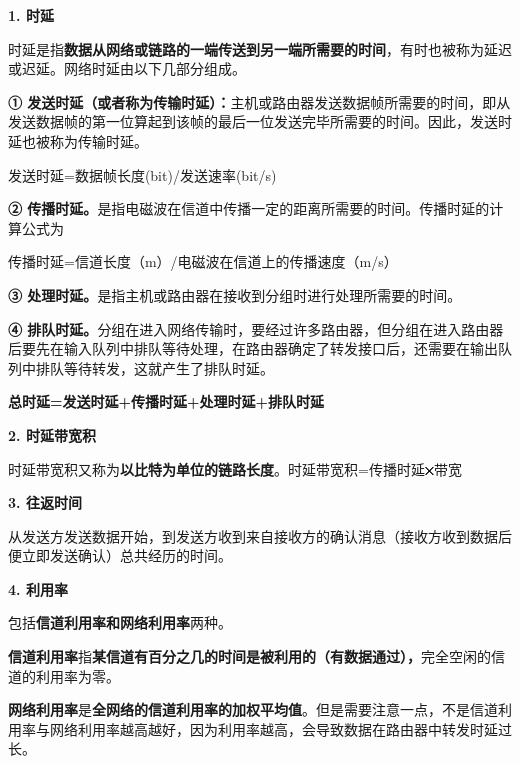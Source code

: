 \textbf{{1. 时延}}

时延是指\textbf{数据从网络或链路的一端传送到另一端所需要的时间}，有时也被称为延迟或迟延。网络时延由以下几部分组成。

\textbf{①
发送时延（或者称为传输时延）：}主机或路由器发送数据帧所需要的时间，即从发送数据帧的第一位算起到该帧的最后一位发送完毕所需要的时间。因此，发送时延也被称为传输时延。

{发送时延=数据帧长度(bit)/发送速率(bit/s)}

\textbf{②
传播时延。}是指电磁波在信道中传播一定的距离所需要的时间。传播时延的计算公式为

{传播时延=信道长度（m）/电磁波在信道上的传播速度（m/s）}

\textbf{③
处理时延。}是指主机或路由器在接收到分组时进行处理所需要的时间。

\textbf{④
排队时延。}分组在进入网络传输时，要经过许多路由器，但分组在进入路由器后要先在输入队列中排队等待处理，在路由器确定了转发接口后，还需要在输出队列中排队等待转发，这就产生了排队时延。

\textbf{总时延=发送时延+传播时延+处理时延+排队时延}

\textbf{{2. 时延带宽积}}

时延带宽积又称为\textbf{以比特为单位的链路长度}。时延带宽积=传播时延\includegraphics[width=0.09375in,height=0.08333in]{texmath/ff0c81times}带宽

\textbf{{3. 往返时间}}

从发送方发送数据开始，到发送方收到来自接收方的确认消息（接收方收到数据后便立即发送确认）总共经历的时间。

\textbf{{4. 利用率}}

包括\textbf{信道利用率和网络利用率}两种。

{{\textbf{信道利用率}}指\textbf{某信道有百分之几的时间是被利用的（有数据通过），}完全空闲的信道的利用率为零。}

{{\textbf{网络利用率}}是\textbf{全网络的信道利用率的加权平均值}。但是需要注意一点，不是信道利用率与网络利用率越高越好，因为利用率越高，会导致数据在路由器中转发时延过长。}
